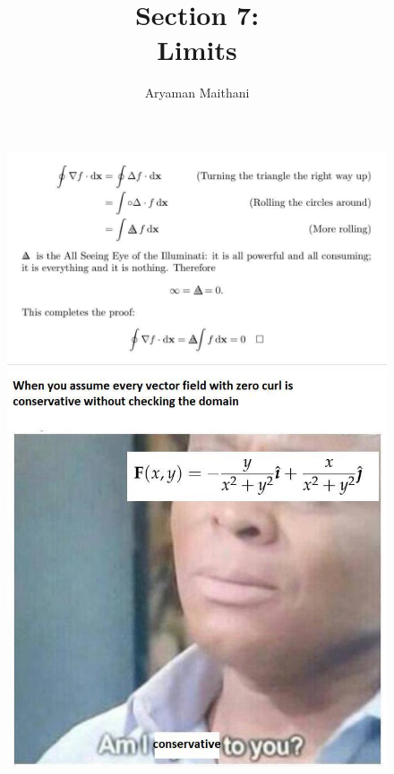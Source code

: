 \documentclass[handout, aspectratio=169]{beamer}
\begin{document}
\begin{frame} 
	\begin{figure}[t]
		\begin{minipage}{0.52\textwidth}
			\centering
			\includegraphics[width=7.75 cm]{24.jpg}
			
		\end{minipage}
		\begin{minipage}{0.44\textwidth}
			\centering
			\includegraphics[width=5 cm]{26.jpg}
			
		\end{minipage}
	\end{figure}
\end{frame}
\author{ }
\title{Section 7:\\ Limits}
\begin{frame} 
	\titlepage
\end{frame}
\author{Aryaman Maithani}
\end{document}
